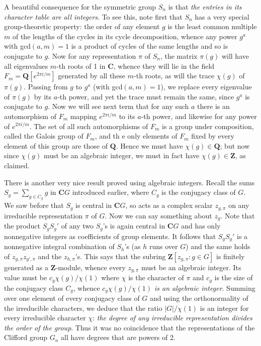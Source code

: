\documentclass[10pt]{article}
\begin{document}
A beautiful consequence for the symmetric group $S_n$ is that {\sl the
  entries in its character table are all integers}. To see this, note
first that $S_n$ has a very special group-theoretic property: the order
of any element $g$ is the least common multiple $m$ of the lengths of
the cycles in its cycle decomposition, whence any power $g^a$ with
gcd$(a,m) = 1$ is a product of cycles of the same lengths and so is
conjugate to $g$. Now for any representation $\pi$ of $S_n$, the matrix
$\pi(g)$ will have all eigenvalues $m$-th roots of 1 in $\mathbf C$,
whence they will lie in the field $F_m = \mathbf Q[e^{2\pi i/m}]$
generated by all these $m$-th roots, as will the trace $\chi(g)$ of
$\pi(g)$. Passing from $g$ to $g^a$ (with gcd$(a,m) = 1$), we replace
every eigenvalue of $\pi(g)$ by its $a$-th power, and yet the trace must
remain the same, since $g^a$ is conjugate to $g$. Now we will see next
term that for any such $a$ there is an automorphism of $F_m$ mapping
$e^{2\pi i/m}$ to its $a$-th power, and likewise for any power of
$e^{2\pi i/m}$. The set of all such automorphisms of $F_m$ is a group
under composition, called the Galois group of $F_m$, and th e only
elements of $F_m$ fixed by every element of this group are those of
$\mathbf Q$. Hence we must have $\chi(g)\in\mathbf Q$; but now since
$\chi(g)$ must be an algebraic integer, we must in fact have
$\chi(g)\in\mathbf Z$, as claimed.

There is another very nice result proved using algebraic integers.
Recall the sums $S_g = \sum_{g\in C_g} g$ in $\mathbf CG$ introduced
earlier, where $C_g$ is the conjugacy class of $G$. We saw before that
$S_g$ is central in $\mathbf CG$, so acts as a complex scalar
$z_{g,\pi}$ on any irreducible representation $\pi$ of $G$. Now we can
say something about $z_g$. Note that the product $S_g S_g'$ of any two
$S_g$'s is again central in $\mathbf CG$ and has only nonnegative
integers as coefficients of group elements. It follows that $S_g S_g'$
is a nonnegative integral combination of $S_h$'s (as $h$ runs over $G$)
and the same holds of $z_{g,\pi} z_{g',\pi}$ and the $z_{h,\pi}$'s. This
says that the subring $\mathbf Z[z_{g,\pi}:g\in G]$ is finitely
generated as a $\mathbf Z$-module, whence every $z_{g,\pi}$ must be an
algebraic integer. Its value must be $c_g \chi(g)/\chi(1)$ where $\chi$
is the character of $\pi$ and $c_g$ is the size of the conjugacy class
$C_g$, whence {\sl $c_g \chi(g)/\chi(1) $ is an algebraic integer}.
Summing over one element of every conjugacy class of $G$ and using the
orthonormality of the irreducible characters, we deduce that the ratio
$| G |/\chi(1)$ is an integer for every irreducible character $\chi$:
{\sl the degree of any irreducible representation divides the order of
  the group}. Thus it was no coincidence that the representations of the
Clifford group $G_n$ all have degrees that are powers of 2.
\end{document}

